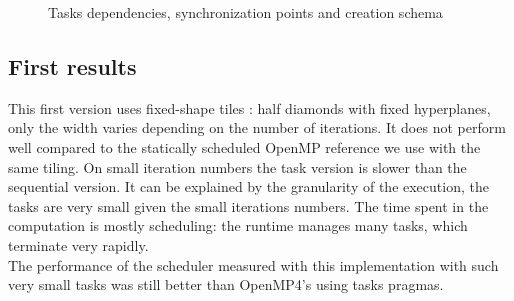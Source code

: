 \documentclass[a4paper,11pt]{article}
\begin{document}
\begin{figure}[h]
 
 \caption{Tasks dependencies, synchronization points and creation schema}
 \label{hdiam_tasking}
\end{figure}


\subsection{First results}

This first version uses fixed-shape tiles : half diamonds with fixed hyperplanes, only the
width varies depending on the number of iterations. It does not perform well compared to
the statically scheduled OpenMP reference we use with the same tiling. On small iteration
numbers the task version is slower than the sequential version. It can be explained by the
granularity of the execution, the tasks are very small given the small iterations numbers.
The time spent in the computation is mostly scheduling: the runtime manages many tasks,
which terminate very rapidly. \\
The performance of the scheduler measured with this implementation with such very small
tasks was still better than OpenMP4’s using tasks pragmas.
\end{document}
